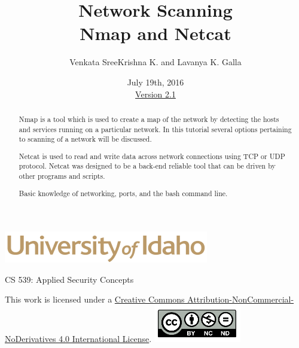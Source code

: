 \documentclass[12pt]{extarticle}
\begin{document}
\title{ Network Scanning \\ \large Nmap and Netcat}
\author{Venkata SreeKrishna K. and Lavanya K. Galla}
\date{July 19th, 2016 \\ \hyperref[changelog]{Version 2.1}} %
\renewcommand{\abstractname}{Executive Summary}
\begin{titlepage}
\maketitle
\keepthetitle %
\begin{center}
\includegraphics[scale=.5]{UofI}

\large{CS 539: Applied Security Concepts}

\vskip 40pt

\end{center}
\begin{abstract}
Nmap is a tool which is used to create a map of the network by detecting the hosts and services running on a particular network. In this tutorial several options pertaining to scanning of a network will be discussed.

Netcat is used to read and write data across network connections using TCP or UDP protocol. Netcat was designed to be a back-end reliable tool that can be driven by other programs and scripts.


Basic knowledge of networking, ports, and the bash command line.
\end{abstract}


\vfill
\begin{center}
This work is licensed under a \href{https://creativecommons.org/licenses/by-nc-nd/2.0/}{Creative Commons Attribution-NonCommercial-NoDerivatives 4.0 International License}.
\vskip 10pt
\includegraphics[scale=.5]{cc}
\end{center}

\end{titlepage}

\end{document}
